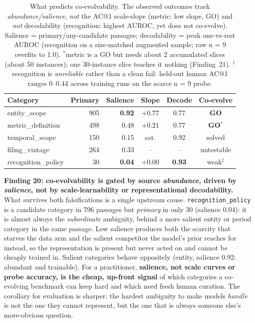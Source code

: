 \begin{table}[t]
\centering

\small
\begin{tabular}{lrrccc}
\toprule
Category & Primary & Salience & Slope & Decode & Co-evolve \\
\midrule
entity\_scope       & 905 & \textbf{0.92} & $+0.77$ & 0.77 & \textbf{GO} \\
metric\_definition  & 498 & 0.48 & $+0.21$ & 0.77 & \textbf{GO}$^*$ \\
temporal\_scope     & 150 & 0.15 & sat.    & 0.92 & solved \\
filing\_vintage     & 264 & 0.33 & --      & --   & untestable \\
recognition\_policy &  30 & \textbf{0.04} & $+0.00$ & \textbf{0.93} & weak$^{\ddagger}$ \\
\bottomrule
\end{tabular}
\caption{What predicts co-evolvability. The observed outcomes track
\emph{abundance/salience}, \emph{not} the AC@1 scale-slope (metric: low slope,
GO) and \emph{not} decodability (recognition: highest AUROC, yet does not
co-evolve). Salience = primary$/$any-candidate passages; decodability = peak
one-vs-rest AUROC (recognition on a size-matched augmented sample; raw n = 9
overfits to 1.0). $^*$metric is a GO but needs about 2 accumulated slices
(about 50 instances); one 30-instance slice teaches it nothing (Finding~21).
$^\ddagger$recognition is \emph{unreliable} rather than a clean fail: held-out human
AC@1 ranges 0--0.44 across training runs on the scarce n = 9 probe.}
\label{tab:learnability}
\end{table}

\textbf{Finding 20: co-evolvability is gated by source \emph{abundance}, driven by
\emph{salience}, not by scale-learnability or representational decodability.} What
survives both falsifications is a single upstream cause. \texttt{recognition\_policy}
is a candidate category in 796 passages but \emph{primary} in only 30 (salience
0.04): it is almost always the \emph{subordinate} ambiguity, behind a more salient
entity or period category in the same passage. Low salience produces both the scarcity
that starves the data arm and the salient competitor the model's prior reaches for
instead, so the representation is present but never acted on and cannot be cheaply
trained in. Salient categories behave oppositely (entity, salience 0.92: abundant and
trainable). For a practitioner, \textbf{salience, not scale curves or probe
accuracy, is the cheap, up-front signal} of which categories a co-evolving benchmark can
keep hard and which need fresh human curation. The corollary for evaluation is
sharper: the hardest ambiguity to make models \emph{handle} is not the one they
cannot represent, but the one that is always someone else's more-obvious question.

